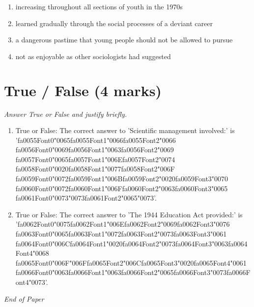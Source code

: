 \documentclass[12pt]{article}
\begin{document}
\begin{enumerate}[label=\arabic*.]
\begin{enumerate}[label=(\alph*)]
    \item increasing throughout all sections of youth in the 1970s
    \item learned gradually through the social processes of a deviant career
    \item a dangerous pastime that young people should not be allowed to pursue
    \item not as enjoyable as other sociologists had suggested
\end{enumerate}
\end{enumerate}

\section*{True / False (4 marks)}
\textit{Answer True or False and justify briefly.}
\begin{enumerate}[label=\arabic*.]
\item True or False: The correct answer to 'Scientific management involved:' is '{\csname fa0055Font0\endcsname\char"0065}{\csname fa0055Font1\endcsname\char"0066}{\csname fa0055Font2\endcsname\char"0066} {\csname fa0056Font0\endcsname\char"0069}{\csname fa0056Font1\endcsname\char"0063}{\csname fa0056Font2\endcsname\char"0069} {\csname fa0057Font0\endcsname\char"0065}{\csname fa0057Font1\endcsname\char"006E}{\csname fa0057Font2\endcsname\char"0074} {\csname fa0058Font0\endcsname\char"0020}{\csname fa0058Font1\endcsname\char"0077}{\csname fa0058Font2\endcsname\char"006F} {\csname fa0059Font0\endcsname\char"0072}{\csname fa0059Font1\endcsname\char"006B}{\csname fa0059Font2\endcsname\char"0020}{\csname fa0059Font3\endcsname\char"0070} {\csname fa0060Font0\endcsname\char"0072}{\csname fa0060Font1\endcsname\char"006F}{\csname fa0060Font2\endcsname\char"0063}{\csname fa0060Font3\endcsname\char"0065} {\csname fa0061Font0\endcsname\char"0073}{\char"0073}{\csname fa0061Font2\endcsname\char"0065}{\char"0073}'.
\item True or False: The correct answer to 'The 1944 Education Act provided:' is '{\csname fa0062Font0\endcsname\char"0075}{\csname fa0062Font1\endcsname\char"006E}{\csname fa0062Font2\endcsname\char"0069}{\csname fa0062Font3\endcsname\char"0076} {\csname fa0063Font0\endcsname\char"0065}{\csname fa0063Font1\endcsname\char"0072}{\csname fa0063Font2\endcsname\char"0073}{\csname fa0063Font3\endcsname\char"0061} {\csname fa0064Font0\endcsname\char"006C}{\csname fa0064Font1\endcsname\char"0020}{\csname fa0064Font2\endcsname\char"0073}{\csname fa0064Font3\endcsname\char"0063}{\csname fa0064Font4\endcsname\char"0068} {\csname fa0065Font0\endcsname\char"006F}{\char"006F}{\csname fa0065Font2\endcsname\char"006C}{\csname fa0065Font3\endcsname\char"0020}{\csname fa0065Font4\endcsname\char"0061} {\csname fa0066Font0\endcsname\char"0063}{\csname fa0066Font1\endcsname\char"0063}{\csname fa0066Font2\endcsname\char"0065}{\csname fa0066Font3\endcsname\char"0073}{\csname fa0066Font4\endcsname\char"0073}'.
\end{enumerate}

\vfill
\noindent\textit{End of Paper}
\end{document}
